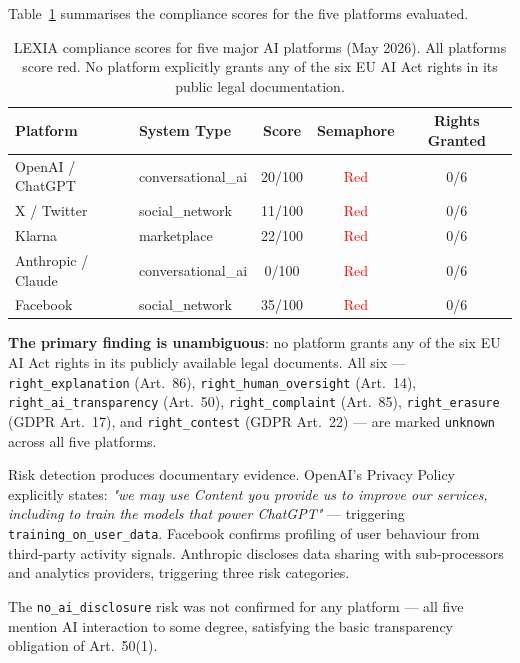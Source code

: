 \documentclass[12pt, a4paper]{article}
\begin{document}
Table~\ref{tab:results} summarises the compliance scores for the five platforms evaluated.

\begin{table}[H]
\centering
\caption{LEXIA compliance scores for five major AI platforms (May 2026). All platforms score red. No platform explicitly grants any of the six EU AI Act rights in its public legal documentation.}
\label{tab:results}
\begin{tabularx}{\textwidth}{lXccc}
\toprule
\textbf{Platform} & \textbf{System Type} & \textbf{Score} & \textbf{Semaphore} & \textbf{Rights Granted} \\
\midrule
OpenAI / ChatGPT  & conversational\_ai & 20/100 & \textcolor{red}{Red}    & 0/6 \\
X / Twitter       & social\_network    & 11/100 & \textcolor{red}{Red}    & 0/6 \\
Klarna            & marketplace        & 22/100 & \textcolor{red}{Red}    & 0/6 \\
Anthropic / Claude & conversational\_ai & 0/100  & \textcolor{red}{Red}    & 0/6 \\
Facebook          & social\_network    & 35/100 & \textcolor{red}{Red}    & 0/6 \\
\bottomrule
\end{tabularx}
\end{table}

\textbf{The primary finding is unambiguous}: no platform grants any of the six EU AI Act rights in its publicly available legal documents. All six --- \texttt{right\_explanation} (Art.\ 86), \texttt{right\_human\_oversight} (Art.\ 14), \texttt{right\_ai\_transparency} (Art.\ 50), \texttt{right\_complaint} (Art.\ 85), \texttt{right\_erasure} (GDPR Art.\ 17), and \texttt{right\_contest} (GDPR Art.\ 22) --- are marked \texttt{unknown} across all five platforms.

Risk detection produces documentary evidence. OpenAI's Privacy Policy explicitly states: \emph{"we may use Content you provide us to improve our services, including to train the models that power ChatGPT"} --- triggering \texttt{training\_on\_user\_data}. Facebook confirms profiling of user behaviour from third-party activity signals. Anthropic discloses data sharing with sub-processors and analytics providers, triggering three risk categories.

The \texttt{no\_ai\_disclosure} risk was not confirmed for any platform --- all five mention AI interaction to some degree, satisfying the basic transparency obligation of Art.\ 50(1).
\end{document}
